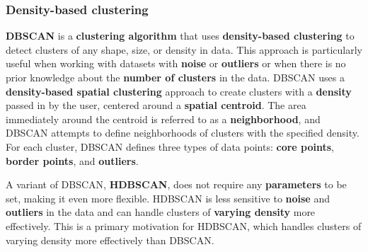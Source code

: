 \subsubsection{Density-based clustering}
\textbf{DBSCAN} is a \textbf{clustering algorithm} that uses \textbf{density-based clustering} to detect clusters of any shape, size, or density in data. This approach is particularly useful when working with datasets with \textbf{noise} or \textbf{outliers} or when there is no prior knowledge about the \textbf{number of clusters} in the data. DBSCAN uses a \textbf{density-based spatial clustering} approach to create clusters with a \textbf{density} passed in by the user, centered around a \textbf{spatial centroid}. The area immediately around the centroid is referred to as a \textbf{neighborhood}, and DBSCAN attempts to define neighborhoods of clusters with the specified density. For each cluster, DBSCAN defines three types of data points: \textbf{core points}, \textbf{border points}, and \textbf{outliers}.

A variant of DBSCAN, \textbf{HDBSCAN}, does not require any \textbf{parameters} to be set, making it even more flexible. HDBSCAN is less sensitive to \textbf{noise} and \textbf{outliers} in the data and can handle clusters of \textbf{varying density} more effectively. This is a primary motivation for HDBSCAN, which handles clusters of varying density more effectively than DBSCAN.
